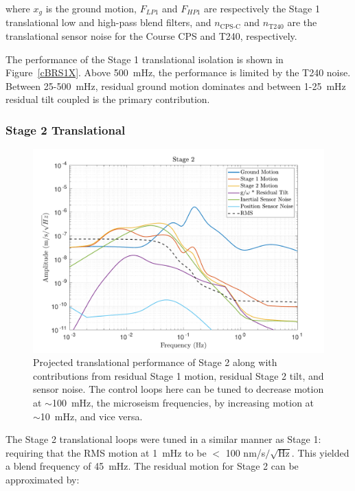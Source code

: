 \documentclass [12pt, proquest]{uwthesis}[2019]
\begin{document}
where $x_g$ is the ground motion, $F_{LP1}$ and $F_{HP1}$ are respectively the Stage 1 translational low and high-pass blend filters, and $n_\text{CPS-C}$ and $n_\text{T240}$ are the translational sensor noise for the Course CPS and T240, respectively.

The performance of the Stage 1 translational isolation is shown in Figure~\ref{cBRS1X}. Above 500~mHz, the performance is limited by the T240 noise. Between 25-500~mHz, residual ground motion dominates and between 1-25~mHz residual tilt coupled is the primary contribution. 


\subsubsection{Stage 2 Translational}

\begin{figure}[!h]
\begin{center}
\includegraphics[width=\textwidth]{cBRS_Model_ST2X.pdf}
\caption[Projected translational performance of Stage 2] {Projected translational performance of Stage 2 along with contributions from residual Stage 1 motion, residual Stage 2 tilt, and sensor noise.  The control loops here can be tuned to decrease motion at $\sim$100~mHz, the microseism frequencies, by increasing motion at $\sim$10~mHz, and vice versa.}
\label{cBRS2X}
\end{center}
\end{figure}
The Stage 2 translational loops were tuned in a similar manner as Stage 1: requiring that the RMS motion at 1~mHz to be $<$ 100 nm/s$/\sqrt{\text{Hz}}$. This yielded  a blend frequency of 45~mHz. The residual motion for Stage 2 can be approximated by:
\end{document}

